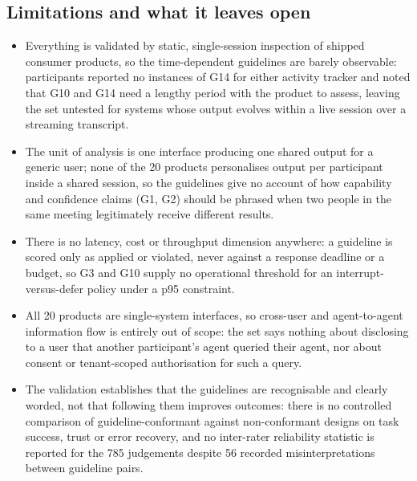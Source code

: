 \subsection{Limitations and what it leaves open}
\begin{itemize}[leftmargin=*, itemsep=1pt, topsep=2pt]
  \item Everything is validated by static, single-session inspection of shipped consumer products, so the time-dependent guidelines are barely observable: participants reported no instances of G14 for either activity tracker and noted that G10 and G14 need a lengthy period with the product to assess, leaving the set untested for systems whose output evolves within a live session over a streaming transcript.
  \item The unit of analysis is one interface producing one shared output for a generic user; none of the 20 products personalises output per participant inside a shared session, so the guidelines give no account of how capability and confidence claims (G1, G2) should be phrased when two people in the same meeting legitimately receive different results.
  \item There is no latency, cost or throughput dimension anywhere: a guideline is scored only as applied or violated, never against a response deadline or a budget, so G3 and G10 supply no operational threshold for an interrupt-versus-defer policy under a p95 constraint.
  \item All 20 products are single-system interfaces, so cross-user and agent-to-agent information flow is entirely out of scope: the set says nothing about disclosing to a user that another participant's agent queried their agent, nor about consent or tenant-scoped authorisation for such a query.
  \item The validation establishes that the guidelines are recognisable and clearly worded, not that following them improves outcomes: there is no controlled comparison of guideline-conformant against non-conformant designs on task success, trust or error recovery, and no inter-rater reliability statistic is reported for the 785 judgements despite 56 recorded misinterpretations between guideline pairs.
\end{itemize}

